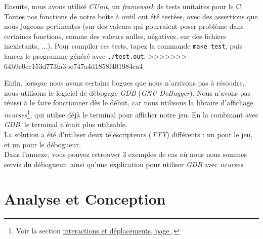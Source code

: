 \documentclass[11pt]{report}
\begin{document}
		\vspace{12pt}
		
		Ensuite, nous avons utilisé \emph{CUnit}, un \emph{framework} de tests unitaires pour le C. Toutes nos fonctions de notre boîte à outil ont été testées, avec des assertions que nous jugeons pertinentes (sur des valeurs qui pourraient poser problème dans certaines fonctions, comme des valeurs nulles, négatives, sur des fichiers inexistants, ...). Pour compiler ces tests, tapez la commande \texttt{make test}, puis lancez le programme généré avec \texttt{./test.out}.
>>>>>>> 64b9e0cc153d773fa3be747a4d1858f401984ca4
		
		\vspace{12pt}
		
		Enfin, lorsque nous avons certains bogues que nous n'arrivons pas à résoudre, nous utilisons le logiciel de débogage \emph{GDB} (\emph{GNU DeBugger}). Nous n'avons pas réussi à le faire fonctionner dès le début, car nous utilisons la libraire d'affichage \emph{ncurses}\footnote{Voir la section \hyperref[ncurses]{interactions et déplacements, page }.}, qui utilise déjà le terminal pour afficher notre jeu. En la combinant avec \emph{GDB}, le terminal n'était plus utilisable.\\
		La solution a été d'utiliser deux téléscripteurs (\emph{TTY}) différents : un pour le jeu, et un pour le débogueur.\\
		Dans l'annexe, vous pouvez retrouver 3 exemples de cas où nous nous sommes servis du débogueur, ainsi qu'une explication pour utiliser \emph{GDB} avec \emph{ncurses}.

\chapter{Analyse et Conception}
\end{document}
